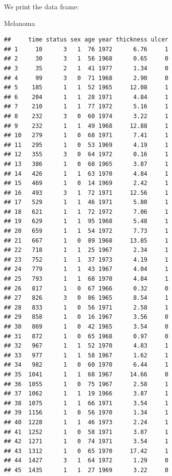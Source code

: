 \documentclass[
]{book}
\newenvironment{Shaded}{\begin{snugshade}}{\end{snugshade}}
\newcommand{\NormalTok}[1]{#1}
\begin{document}
We print the data frame:

\begin{Shaded}
\begin{Highlighting}[]
\NormalTok{Melanoma}
\end{Highlighting}
\end{Shaded}

\begin{verbatim}
##     time status sex age year thickness ulcer
## 1     10      3   1  76 1972      6.76     1
## 2     30      3   1  56 1968      0.65     0
## 3     35      2   1  41 1977      1.34     0
## 4     99      3   0  71 1968      2.90     0
## 5    185      1   1  52 1965     12.08     1
## 6    204      1   1  28 1971      4.84     1
## 7    210      1   1  77 1972      5.16     1
## 8    232      3   0  60 1974      3.22     1
## 9    232      1   1  49 1968     12.88     1
## 10   279      1   0  68 1971      7.41     1
## 11   295      1   0  53 1969      4.19     1
## 12   355      3   0  64 1972      0.16     1
## 13   386      1   0  68 1965      3.87     1
## 14   426      1   1  63 1970      4.84     1
## 15   469      1   0  14 1969      2.42     1
## 16   493      3   1  72 1971     12.56     1
## 17   529      1   1  46 1971      5.80     1
## 18   621      1   1  72 1972      7.06     1
## 19   629      1   1  95 1968      5.48     1
## 20   659      1   1  54 1972      7.73     1
## 21   667      1   0  89 1968     13.85     1
## 22   718      1   1  25 1967      2.34     1
## 23   752      1   1  37 1973      4.19     1
## 24   779      1   1  43 1967      4.04     1
## 25   793      1   1  68 1970      4.84     1
## 26   817      1   0  67 1966      0.32     0
## 27   826      3   0  86 1965      8.54     1
## 28   833      1   0  56 1971      2.58     1
## 29   858      1   0  16 1967      3.56     0
## 30   869      1   0  42 1965      3.54     0
## 31   872      1   0  65 1968      0.97     0
## 32   967      1   1  52 1970      4.83     1
## 33   977      1   1  58 1967      1.62     1
## 34   982      1   0  60 1970      6.44     1
## 35  1041      1   1  68 1967     14.66     0
## 36  1055      1   0  75 1967      2.58     1
## 37  1062      1   1  19 1966      3.87     1
## 38  1075      1   1  66 1971      3.54     1
## 39  1156      1   0  56 1970      1.34     1
## 40  1228      1   1  46 1973      2.24     1
## 41  1252      1   0  58 1971      3.87     1
## 42  1271      1   0  74 1971      3.54     1
## 43  1312      1   0  65 1970     17.42     1
## 44  1427      3   1  64 1972      1.29     0
## 45  1435      1   1  27 1969      3.22     0

\end{verbatim}
\end{document}

